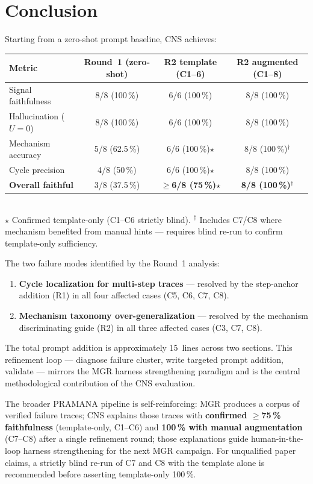 \documentclass[11pt,a4paper]{article}
\begin{document}
\section{Conclusion}

Starting from a zero-shot prompt baseline, CNS achieves:

\begin{center}
\begin{tabular}{lccc}
\toprule
\textbf{Metric} & \textbf{Round~1 (zero-shot)} & \textbf{R2 template (C1--6)} & \textbf{R2 augmented (C1--8)} \\
\midrule
Signal faithfulness & 8/8 (100\,\%)  & 6/6 (100\,\%) & 8/8 (100\,\%) \\
Hallucination ($U=0$) & 8/8 (100\,\%) & 6/6 (100\,\%) & 8/8 (100\,\%) \\
Mechanism accuracy   & 5/8 (62.5\,\%)& 6/6 (100\,\%)$\star$ & 8/8 (100\,\%)$^{\dagger}$ \\
Cycle precision      & 4/8 (50\,\%)  & 6/6 (100\,\%)$\star$ & 8/8 (100\,\%) \\
\textbf{Overall faithful} & 3/8 (37.5\,\%) & \textbf{$\geq$6/8 (75\,\%)}$\star$ & \textbf{8/8 (100\,\%)}$^{\dagger}$ \\
\bottomrule
\end{tabular}
\\[4pt]
{\small
$\star$ Confirmed template-only (C1--C6 strictly blind).\quad
$^{\dagger}$ Includes C7/C8 where mechanism benefited from manual hints --- requires blind re-run to confirm template-only sufficiency.}
\end{center}

The two failure modes identified by the Round~1 analysis:
\begin{enumerate}
  \item \textbf{Cycle localization for multi-step traces} --- resolved by the
    step-anchor addition (R1) in all four affected cases (C5, C6, C7, C8).
  \item \textbf{Mechanism taxonomy over-generalization} --- resolved by the
    mechanism discriminating guide (R2) in all three affected cases
    (C3, C7, C8).
\end{enumerate}

The total prompt addition is approximately 15~lines across two sections.
This refinement loop --- diagnose failure cluster, write targeted prompt
addition, validate --- mirrors the MGR harness strengthening paradigm and
is the central methodological contribution of the CNS evaluation.

The broader PRAMANA pipeline is self-reinforcing: MGR produces a corpus of
verified failure traces; CNS explains those traces with \textbf{confirmed
$\geq$75\,\% faithfulness} (template-only, C1--C6) and \textbf{100\,\% with
manual augmentation} (C7--C8) after a single refinement round; those
explanations guide human-in-the-loop harness strengthening for the next MGR
campaign. For unqualified paper claims, a strictly blind re-run of C7 and C8
with the template alone is recommended before asserting template-only 100\,\%.
\end{document}
